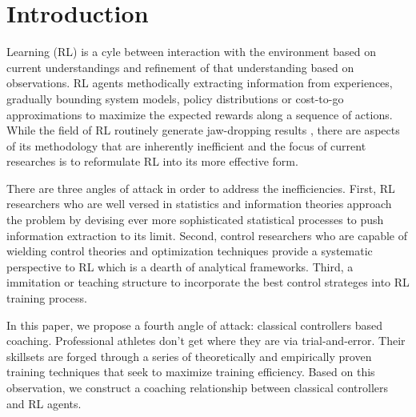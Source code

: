 \documentclass[journal]{IEEEtran}
\begin{document}
\section{Introduction}
 Learning (RL) is a cyle between interaction with the environment based on current understandings and refinement of that understanding based on observations. RL agents methodically extracting information from experiences, gradually bounding system models, policy distributions or cost-to-go approximations to maximize the expected rewards along a sequence of actions. While the field of RL routinely generate jaw-dropping results \cite{Mnih2013PlayingAW}\cite{Hausknecht2015DeepRQ}\cite{Andrychowicz2020LearningDI}\cite{Kalashnikov2018QTOptSD}\cite{Lee2020LearningQL}, there are aspects of its methodology that are inherently inefficient and the focus of current researches is to reformulate RL into its more effective form.

There are three angles of attack in order to address the inefficiencies. First, RL researchers who are well versed in statistics and information theories approach the problem by devising ever more sophisticated statistical processes to push information extraction to its limit.\cite{Ho2016GenerativeAI}\cite{Finn2016UnsupervisedLF}\cite{Pathak2017CuriosityDrivenEB}\cite{Burda2019LargeScaleSO}\cite{Finn2017ModelAgnosticMF}\cite{Mishra2018ASN}\cite{Nachum2018DataEfficientHR}\cite{Vezhnevets2017FeUdalNF}\cite{Blundell2015WeightUI}\cite{Gal2017ConcreteD}\cite{Dasgupta2019CausalRF}\cite{Zhang2020DesigningOD} Second, control researchers who are capable of wielding control theories and optimization techniques provide a systematic perspective to RL which is a dearth of analytical frameworks.\cite{Weinan2017APO}\cite{Dupont2019AugmentedNO}\cite{Betancourt2018OnSO}\cite{Nachum2020ReinforcementLV}\cite{Luo2019ADR}\cite{Wu2020DataDrivenDL}\cite{Shi2019NeuralLS}\cite{Hewing2020LearningBasedMP}\cite{Mohan2020EmbeddingHP}\cite{Lusch2018DeepLF}\cite{Bai2019DeepEM}\cite{BelbutePeres2020CombiningDP} Third, a immitation or teaching structure to incorporate the best control strateges into RL training process. \cite{Knox2009InteractivelySA}\cite{Knox2010CombiningMF}\cite{Peng2018DeepMimicED}\cite{Peng2020LearningAR}\cite{Paine2018OneShotHI}

In this paper, we propose a fourth angle of attack: classical controllers based coaching. Professional athletes don't get where they are via trial-and-error. Their skillsets are forged through a series of theoretically and empirically proven training techniques that seek to maximize training efficiency. Based on this observation, we construct a coaching relationship between classical controllers and RL agents.
\end{document}
